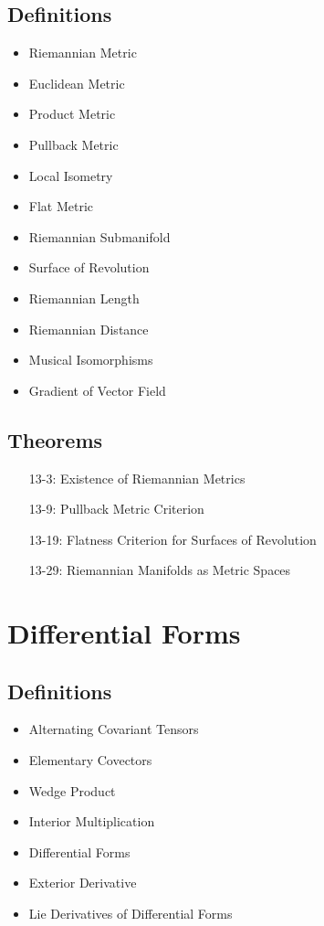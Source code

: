 \documentclass[11.5pt]{scrartcl}
\newcommand{\<}{\langle}
\renewcommand{\>}{\rangle}
\begin{document}
\subsection{Definitions}
\begin{itemize}
\item Riemannian Metric
\item Euclidean Metric
\item Product Metric
\item Pullback Metric
\item Local Isometry
\item Flat Metric
\item Riemannian Submanifold
\item Surface of Revolution
\item Riemannian Length
\item Riemannian Distance 
\item Musical Isomorphisms
\item Gradient of Vector Field
\end{itemize}
\subsection{Theorems}
\begin{itemize}
\item[13-3:] Existence of Riemannian Metrics
\item[13-9:] Pullback Metric Criterion
\item[13-19:] Flatness Criterion for Surfaces of Revolution
\item[13-29:] Riemannian Manifolds as Metric Spaces
\end{itemize}
\section{Differential Forms}
\subsection{Definitions}
\begin{itemize}
\item Alternating Covariant Tensors
\item Elementary Covectors
\item Wedge Product
\item Interior Multiplication
\item Differential Forms
\item Exterior Derivative
\item Lie Derivatives of Differential Forms
\end{itemize}
\end{document}
